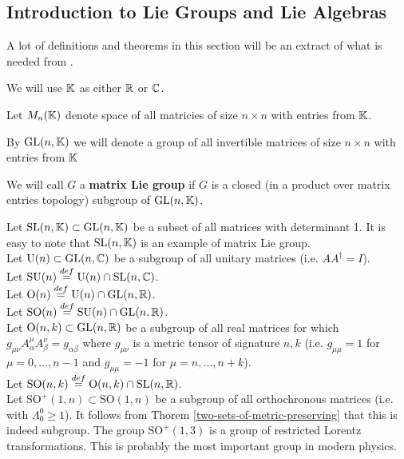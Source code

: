 \documentclass[main.tex]{subfiles}
\begin{document}
\subsection{Introduction to Lie Groups and Lie Algebras}

A lot of definitions and theorems in this section will be an extract of what is needed from \cite{hall2015}.

We will use $\mathbb{K}$ as either $\mathbb{R}$ or $\mathbb{C}$.

Let $M_n(\mathbb{K})$ denote space of all matricies of size $n\times n$ with entries from $\mathbb{K}$.

By $\text{GL}(n, \mathbb{K})$ we will denote a group of all invertible matrices of size $n\times n$ with entries from $\mathbb{K}$


\begin{definition}
We will call $G$ a \textbf{matrix Lie group} if $G$ is a closed (in a product over matrix entries topology) subgroup of $\text{GL}(n, \mathbb{K})$.
\end{definition}

Let $\text{SL}(n, \mathbb{K}) \subset \text{GL}(n, \mathbb{K})$ be a subset of all matrices with determinant 1. It is easy to note that $\text{SL}(n, \mathbb{K})$ is an example of matrix Lie group.\\

Let $\text{U}(n)\subset \text{GL}(n, \mathbb{C})$ be a subgroup of all unitary matrices (i.e. $AA^\dagger = I$).\\

Let $\text{SU}(n) \stackrel{def}{=}  \text{U}(n) \cap \text{SL}(n, \mathbb{C})$.\\

Let $\text{O}(n) \stackrel{def}{=} \text{U}(n) \cap \text{GL}(n, \mathbb{R})$.\\

Let $\text{SO}(n) \stackrel{def}{=} \text{SU}(n) \cap \text{GL}(n, \mathbb{R})$.\\


Let $\text{O}(n, k) \subset \text{GL}(n, \mathbb{R})$ be a subgroup of all real matrices for which 
$g_{\mu\nu} A^\mu_\alpha A^\nu_\beta = g_{\alpha\beta}$ where $g_{\mu\nu}$ is a metric tensor of signature $n, k$ (i.e. $g_{\mu\mu} = 1$ for $\mu = 0, \dots, n - 1$ and $g_{\mu\mu} = -1$ for $\mu = n, \dots, n + k$).\\

Let $\text{SO}(n, k) \stackrel{def}{=} \text{O}(n, k) \cap \text{SL}(n, \mathbb{R})$.\\

Let $\text{SO}^+(1, n) \subset \text{SO}(1, n)$ be a subgroup of all orthochronous matrices (i.e. with $\Lambda_0^0 \geq 1$). It follows from Thorem \ref{two-sets-of-metric-preserving} that this is indeed subgroup. The group $\text{SO}^+(1, 3)$ is a group of restricted Lorentz transformations. This is probably the most important group in modern physics.
\end{document}
